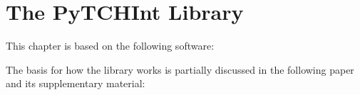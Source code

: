 \chapter{The PyTCHInt Library}
\label{chap:pytchint}

This chapter is based on the following software:\\

The basis for how the library works is partially discussed in the following paper and its supplementary material: \\
